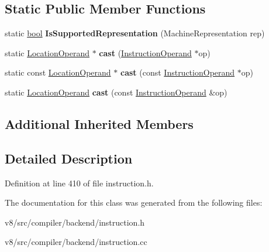 \subsection*{Static Public Member Functions}
\begin{DoxyCompactItemize}
\item 
\mbox{\label{classv8_1_1internal_1_1compiler_1_1LocationOperand_ab6141638987e754e03824fc8694f4c0e}} 
static \mbox{\hyperlink{classbool}{bool}} {\bfseries Is\+Supported\+Representation} (Machine\+Representation rep)
\item 
\mbox{\label{classv8_1_1internal_1_1compiler_1_1LocationOperand_a14a0a8abb4b6ac796e0fae75948a270e}} 
static \mbox{\hyperlink{classv8_1_1internal_1_1compiler_1_1LocationOperand}{Location\+Operand}} $\ast$ {\bfseries cast} (\mbox{\hyperlink{classv8_1_1internal_1_1compiler_1_1InstructionOperand}{Instruction\+Operand}} $\ast$op)
\item 
\mbox{\label{classv8_1_1internal_1_1compiler_1_1LocationOperand_ad029652faf84f4ee000715b9c9d28c3d}} 
static const \mbox{\hyperlink{classv8_1_1internal_1_1compiler_1_1LocationOperand}{Location\+Operand}} $\ast$ {\bfseries cast} (const \mbox{\hyperlink{classv8_1_1internal_1_1compiler_1_1InstructionOperand}{Instruction\+Operand}} $\ast$op)
\item 
\mbox{\label{classv8_1_1internal_1_1compiler_1_1LocationOperand_a0beb118c4233c0d32eaca5afe2bf0990}} 
static \mbox{\hyperlink{classv8_1_1internal_1_1compiler_1_1LocationOperand}{Location\+Operand}} {\bfseries cast} (const \mbox{\hyperlink{classv8_1_1internal_1_1compiler_1_1InstructionOperand}{Instruction\+Operand}} \&op)
\end{DoxyCompactItemize}
\subsection*{Additional Inherited Members}


\subsection{Detailed Description}


Definition at line 410 of file instruction.\+h.



The documentation for this class was generated from the following files\+:\begin{DoxyCompactItemize}
\item 
v8/src/compiler/backend/instruction.\+h\item 
v8/src/compiler/backend/instruction.\+cc\end{DoxyCompactItemize}
